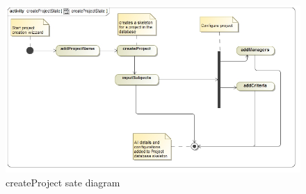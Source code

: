\begin{figure}[h]
    \centering
    \includegraphics[width=15cm]{./graphics/createProjectState.jpg}
    \caption{createProject sate diagram}
    \label{fig:createProject_state}
\end{figure}